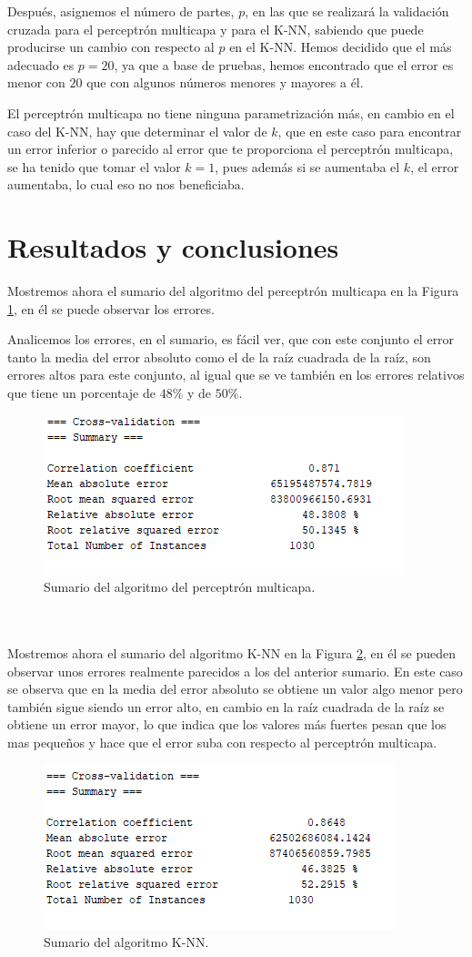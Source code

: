 \documentclass[a4paper, 11pt, twoside, openany, onecolumn, final]{memoir}
\begin{document}
	Después, asignemos el número de partes, $p$, en las que se realizará la validación cruzada para el perceptrón multicapa y para el K-NN, sabiendo que puede producirse un cambio con respecto al $p$ en el K-NN. Hemos decidido que el más adecuado es $p=20$, ya que a base de pruebas, hemos encontrado que el error es menor con $20$ que con algunos números menores y mayores a él.
	
	El perceptrón multicapa no tiene ninguna parametrización más, en cambio en el caso del K-NN, hay que determinar el valor de $k$, que en este caso para encontrar un error inferior o parecido al error que te proporciona el perceptrón multicapa, se ha tenido que tomar el valor $k=1$, pues además si se aumentaba el $k$, el error aumentaba, lo cual eso no nos beneficiaba.
	
	\section{Resultados y conclusiones}
	Mostremos ahora el sumario del algoritmo del perceptrón multicapa en la Figura \ref{SumarioPerceptron}, en él se puede observar los errores.
	
	Analicemos los errores, en el sumario, es fácil ver, que con este conjunto el error tanto la media del error absoluto como el de la raíz cuadrada de la raíz, son errores altos para este conjunto, al igual que se ve también en los errores relativos que tiene un porcentaje de $48\%$ y de $50\%$.
	\begin{figure}
  		\centering
   	\includegraphics{Imagenes/SumarioPerceptron}
  		\caption{Sumario del algoritmo del perceptrón multicapa.}
  		\label{SumarioPerceptron}
	\end{figure}
\\	\\
	Mostremos ahora el sumario del algoritmo K-NN en la Figura \ref{SumarioKNN}, en él se pueden observar unos errores realmente parecidos a los del anterior sumario. En este caso se observa que en la media del error absoluto se obtiene un valor algo menor pero también sigue siendo un error alto, en cambio en la raíz cuadrada de la raíz se obtiene un error mayor, lo que indica que los valores más fuertes pesan que los mas pequeños y hace que el error suba con respecto al perceptrón multicapa.  	 
	
	\begin{figure}
  		\centering
   	\includegraphics{Imagenes/SumarioKNN}
  		\caption{Sumario del algoritmo K-NN.}
  		\label{SumarioKNN}
	\end{figure}	 
	 
\end{document}
